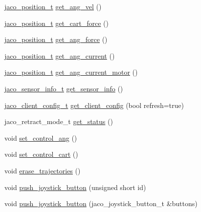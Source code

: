 \begin{DoxyCompactItemize}
\item 
\hyperlink{structKinDrv_1_1jaco__position__t}{jaco\+\_\+position\+\_\+t} \hyperlink{classKinDrv_1_1JacoArm_ae88dc68436689a1be5abc7291fd949fb}{get\+\_\+ang\+\_\+vel} ()
\item 
\hyperlink{structKinDrv_1_1jaco__position__t}{jaco\+\_\+position\+\_\+t} \hyperlink{classKinDrv_1_1JacoArm_afb6babe978a36868e84a87bbf38377d3}{get\+\_\+cart\+\_\+force} ()
\item 
\hyperlink{structKinDrv_1_1jaco__position__t}{jaco\+\_\+position\+\_\+t} \hyperlink{classKinDrv_1_1JacoArm_ab5335167e3e6d6d9d946c394602f26d6}{get\+\_\+ang\+\_\+force} ()
\item 
\hyperlink{structKinDrv_1_1jaco__position__t}{jaco\+\_\+position\+\_\+t} \hyperlink{classKinDrv_1_1JacoArm_a75d1a16834c4b868c1131fb8331ecce9}{get\+\_\+ang\+\_\+current} ()
\item 
\hyperlink{structKinDrv_1_1jaco__position__t}{jaco\+\_\+position\+\_\+t} \hyperlink{classKinDrv_1_1JacoArm_a7d19780dad5015d01f3060e5661ef2d6}{get\+\_\+ang\+\_\+current\+\_\+motor} ()
\item 
\hyperlink{structKinDrv_1_1jaco__sensor__info__t}{jaco\+\_\+sensor\+\_\+info\+\_\+t} \hyperlink{classKinDrv_1_1JacoArm_a7cb20f738966e5d534ab36689640fe47}{get\+\_\+sensor\+\_\+info} ()
\item 
\hyperlink{structKinDrv_1_1jaco__client__config__t}{jaco\+\_\+client\+\_\+config\+\_\+t} \hyperlink{classKinDrv_1_1JacoArm_a8352481e3c9cd7e59d0ac77b1f0936a1}{get\+\_\+client\+\_\+config} (bool refresh=true)
\item 
jaco\+\_\+retract\+\_\+mode\+\_\+t \hyperlink{classKinDrv_1_1JacoArm_ae0a8a52fec0a30e0e6ceab9347ec7db7}{get\+\_\+status} ()
\item 
void \hyperlink{classKinDrv_1_1JacoArm_acbd8b383de41ad11196dc48382abacb9}{set\+\_\+control\+\_\+ang} ()
\item 
void \hyperlink{classKinDrv_1_1JacoArm_ad84d198e4c36385a5caba118993542b4}{set\+\_\+control\+\_\+cart} ()
\item 
void \hyperlink{classKinDrv_1_1JacoArm_a61aa6c31045d25fd302de1aec99bd310}{erase\+\_\+trajectories} ()
\item 
void \hyperlink{classKinDrv_1_1JacoArm_a38fb52594d06c1113d9a0060b2cf6f9e}{push\+\_\+joystick\+\_\+button} (unsigned short id)
\item 
void \hyperlink{classKinDrv_1_1JacoArm_af36aba92c4ddd4ffa398aa5cba9095d2}{push\+\_\+joystick\+\_\+button} (jaco\+\_\+joystick\+\_\+button\+\_\+t \&buttons)
\item 

\end{DoxyCompactItemize}
